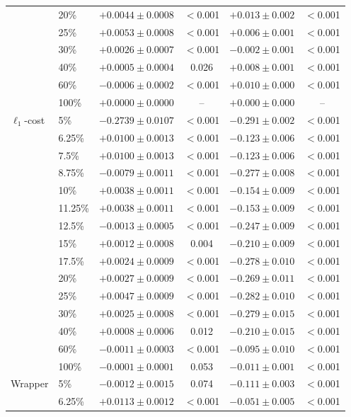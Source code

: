 \begin{tabular}{llcccc}
 & 20\% & $+0.0044\pm0.0008$ & $<$0.001 & $+0.013\pm0.002$ & $<$0.001 \\
 & 25\% & $+0.0053\pm0.0008$ & $<$0.001 & $+0.006\pm0.001$ & $<$0.001 \\
 & 30\% & $+0.0026\pm0.0007$ & $<$0.001 & $-0.002\pm0.001$ & $<$0.001 \\
 & 40\% & $+0.0005\pm0.0004$ & 0.026 & $+0.008\pm0.001$ & $<$0.001 \\
 & 60\% & $-0.0006\pm0.0002$ & $<$0.001 & $+0.010\pm0.000$ & $<$0.001 \\
 & 100\% & $+0.0000\pm0.0000$ & -- & $+0.000\pm0.000$ & -- \\
\midrule
$\ell_1$-cost & 5\% & $-0.2739\pm0.0107$ & $<$0.001 & $-0.291\pm0.002$ & $<$0.001 \\
 & 6.25\% & $+0.0100\pm0.0013$ & $<$0.001 & $-0.123\pm0.006$ & $<$0.001 \\
 & 7.5\% & $+0.0100\pm0.0013$ & $<$0.001 & $-0.123\pm0.006$ & $<$0.001 \\
 & 8.75\% & $-0.0079\pm0.0011$ & $<$0.001 & $-0.277\pm0.008$ & $<$0.001 \\
 & 10\% & $+0.0038\pm0.0011$ & $<$0.001 & $-0.154\pm0.009$ & $<$0.001 \\
 & 11.25\% & $+0.0038\pm0.0011$ & $<$0.001 & $-0.153\pm0.009$ & $<$0.001 \\
 & 12.5\% & $-0.0013\pm0.0005$ & $<$0.001 & $-0.247\pm0.009$ & $<$0.001 \\
 & 15\% & $+0.0012\pm0.0008$ & 0.004 & $-0.210\pm0.009$ & $<$0.001 \\
 & 17.5\% & $+0.0024\pm0.0009$ & $<$0.001 & $-0.278\pm0.010$ & $<$0.001 \\
 & 20\% & $+0.0027\pm0.0009$ & $<$0.001 & $-0.269\pm0.011$ & $<$0.001 \\
 & 25\% & $+0.0047\pm0.0009$ & $<$0.001 & $-0.282\pm0.010$ & $<$0.001 \\
 & 30\% & $+0.0025\pm0.0008$ & $<$0.001 & $-0.279\pm0.015$ & $<$0.001 \\
 & 40\% & $+0.0008\pm0.0006$ & 0.012 & $-0.210\pm0.015$ & $<$0.001 \\
 & 60\% & $-0.0011\pm0.0003$ & $<$0.001 & $-0.095\pm0.010$ & $<$0.001 \\
 & 100\% & $-0.0001\pm0.0001$ & 0.053 & $-0.011\pm0.001$ & $<$0.001 \\
\midrule
Wrapper & 5\% & $-0.0012\pm0.0015$ & 0.074 & $-0.111\pm0.003$ & $<$0.001 \\
 & 6.25\% & $+0.0113\pm0.0012$ & $<$0.001 & $-0.051\pm0.005$ & $<$0.001 \\

\end{tabular}
